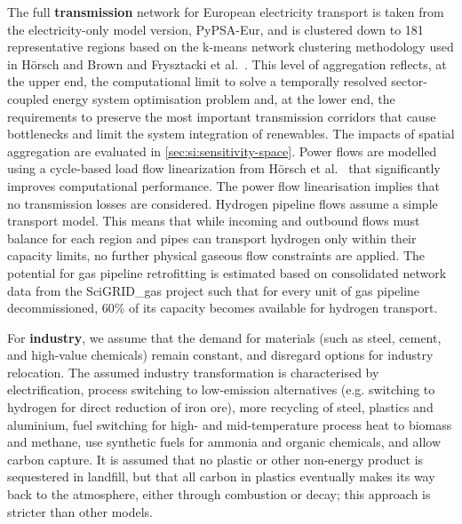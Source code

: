 The full \textbf{transmission} network for European electricity transport is
taken from the electricity-only model version,
PyPSA-Eur,\cite{horschPyPSAEurOpen2018} and is clustered down to 181
representative regions based on the k-means network clustering methodology used
in Hörsch and Brown\cite{Hoersch2017} and Frysztacki et
al.~\cite{frysztackiStrongEffect2021}. This level of aggregation reflects, at
the upper end, the computational limit to solve a temporally resolved
sector-coupled energy system optimisation problem and, at the lower end, the
requirements to preserve the most important transmission corridors that cause
bottlenecks and limit the system integration of renewables. The impacts of
spatial aggregation are evaluated in \cref{sec:si:sensitivity-space}. Power
flows are modelled using a cycle-based load flow linearization from Hörsch et
al.~\cite{horschLinearOptimal2018} that significantly improves computational
performance. The power flow linearisation implies that no transmission losses
are considered. Hydrogen pipeline flows assume a simple transport model. This
means that while incoming and outbound flows must balance for each region and
pipes can transport hydrogen only within their capacity limits, no further
physical gaseous flow constraints are applied. The potential for gas pipeline
retrofitting is estimated based on consolidated network data from the
SciGRID\_gas project \cite{plutaSciGRIDGas2022a} such that for every unit of gas
pipeline decommissioned, 60\% of its capacity becomes available for hydrogen
transport.\cite{gasforclimateEuropeanHydrogen2020}

For \textbf{industry}, we assume that the demand for materials (such as steel,
cement, and high-value chemicals) remain constant, and disregard options for
industry relocation.\cite{toktarovaInteractionElectrified2022} The assumed
industry transformation is characterised by electrification, process switching
to low-emission alternatives (e.g. switching to hydrogen for direct reduction of
iron ore\cite{voglAssessmentHydrogen2018}), more recycling of steel, plastics
and aluminium\cite{circular_economy}, fuel switching for high- and
mid-temperature process heat to biomass and methane, use synthetic fuels for
ammonia and organic chemicals, and allow carbon capture. It is assumed that no
plastic or other non-energy product is sequestered in landfill, but that all
carbon in plastics eventually makes its way back to the atmosphere, either
through combustion or decay; this approach is stricter than other models.
\cite{in-depth_2018}

